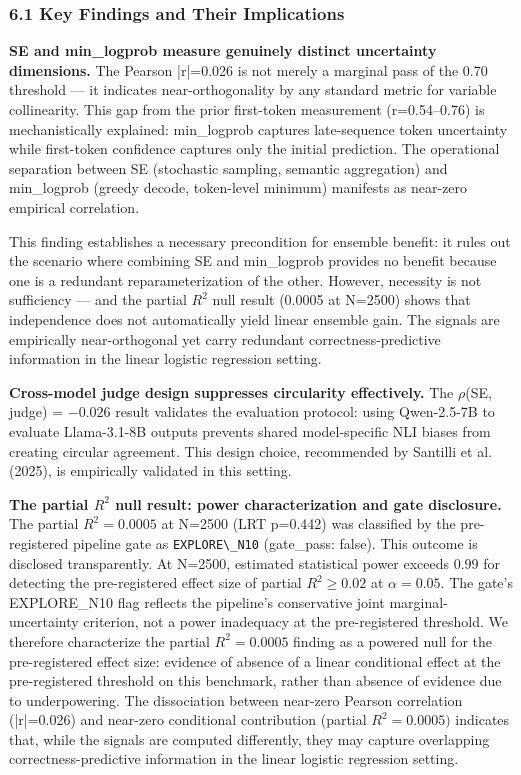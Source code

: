 
\subsubsection{6.1 Key Findings and Their Implications}

\textbf{SE and min\_logprob measure genuinely distinct uncertainty dimensions.} The Pearson |r|=0.026 is not merely a marginal pass of the 0.70 threshold --- it indicates near-orthogonality by any standard metric for variable collinearity. This gap from the prior first-token measurement (r=0.54--0.76) is mechanistically explained: min\_logprob captures late-sequence token uncertainty while first-token confidence captures only the initial prediction. The operational separation between SE (stochastic sampling, semantic aggregation) and min\_logprob (greedy decode, token-level minimum) manifests as near-zero empirical correlation.

This finding establishes a necessary precondition for ensemble benefit: it rules out the scenario where combining SE and min\_logprob provides no benefit because one is a redundant reparameterization of the other. However, necessity is not sufficiency --- and the partial $R^2$ null result (0.0005 at N=2500) shows that independence does not automatically yield linear ensemble gain. The signals are empirically near-orthogonal yet carry redundant correctness-predictive information in the linear logistic regression setting.

\textbf{Cross-model judge design suppresses circularity effectively.} The $\rho$(SE, judge) = $-0.026$ result validates the evaluation protocol: using Qwen-2.5-7B to evaluate Llama-3.1-8B outputs prevents shared model-specific NLI biases from creating circular agreement. This design choice, recommended by Santilli et al. (2025), is empirically validated in this setting.

\textbf{The partial $R^2$ null result: power characterization and gate disclosure.} The partial $R^{2}=0.0005$ at N=2500 (LRT p=0.442) was classified by the pre-registered pipeline gate as \texttt{EXPLORE\textbackslash \_N10} (gate\_pass: false). This outcome is disclosed transparently. At N=2500, estimated statistical power exceeds 0.99 for detecting the pre-registered effect size of partial $R^{2}\geq 0.02$ at $\alpha =0.05$. The gate's EXPLORE\_N10 flag reflects the pipeline's conservative joint marginal-uncertainty criterion, not a power inadequacy at the pre-registered threshold. We therefore characterize the partial $R^{2}=0.0005$ finding as a powered null for the pre-registered effect size: evidence of absence of a linear conditional effect at the pre-registered threshold on this benchmark, rather than absence of evidence due to underpowering. The dissociation between near-zero Pearson correlation (|r|=0.026) and near-zero conditional contribution (partial $R^{2}=0.0005)$ indicates that, while the signals are computed differently, they may capture overlapping correctness-predictive information in the linear logistic regression setting.

